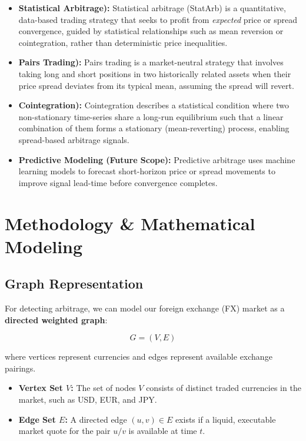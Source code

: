 \documentclass[letterpaper,11pt]{report}
\begin{document}
\begin{itemize}
    \item \textbf{Statistical Arbitrage):}  
    Statistical arbitrage (StatArb) is a quantitative, data-based trading strategy that seeks to profit from \emph{expected} price or spread convergence, guided by statistical relationships such as mean reversion or cointegration, rather than deterministic price inequalities. 

    \item \textbf{Pairs Trading):}  
    Pairs trading is a market-neutral strategy that involves taking long and short positions in two historically related assets when their price spread deviates from its typical mean, assuming the spread will revert. 

    \item \textbf{Cointegration):}  
    Cointegration describes a statistical condition where two non-stationary time-series share a long-run equilibrium such that a linear combination of them forms a stationary (mean-reverting) process, enabling spread-based arbitrage signals. 

    \item \textbf{Predictive Modeling (Future Scope):}  
    Predictive arbitrage uses machine learning models to forecast short-horizon price or spread movements to improve signal lead-time before convergence completes. 
\end{itemize}


\chapter{Methodology \& Mathematical Modeling}

\section{Graph Representation}

For detecting arbitrage, we can model our foreign exchange (FX) market as a \textbf{directed weighted graph}:

\begin{equation}
G = (V, E)
\end{equation}

where vertices represent currencies and edges represent available exchange pairings.

\begin{itemize}
    \item \textbf{Vertex Set $V$:}  
    The set of nodes $V$ consists of distinct traded currencies in the market, such as USD, EUR, and JPY.

    \item \textbf{Edge Set $E$:}  
    A directed edge $(u, v) \in E$ exists if a liquid, executable market quote for the pair $u/v$ is available at time $t$.
\end{itemize}
\end{document}
